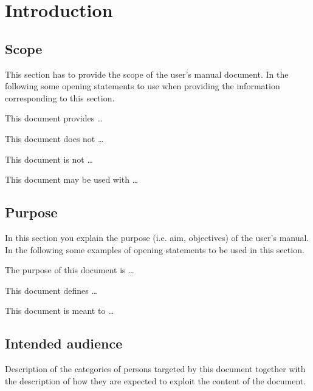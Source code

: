 \chapter{Introduction}
\label{chap:introduction}

\section{Scope}
 
This section has to provide the scope of the user's manual document.
In the following some opening statements to use when providing the
information corresponding to this section.

This document provides \ldots


This document does not \ldots 
 
This document is not \ldots

 
This document may be used with \ldots




\section{Purpose}
In this section you explain the purpose (i.e. aim, objectives) of the user's
manual. In the following some examples of opening statements to be used in this
section.

The purpose of this document is \ldots

This document defines \ldots

This document is meant to \ldots



\section{Intended audience}
Description of the categories of persons targeted by this document together with the description of how they are expected to exploit the content of the document.


